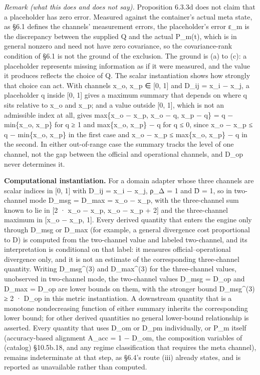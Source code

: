 \documentclass[
]{article}
\begin{document}
\emph{Remark (what this does and does not say).} Proposition 6.3.3d does
not claim that a placeholder has zero error. Measured against the
container's actual meta state, as §6.1 defines the channels' measurement
errors, the placeholder's error ε\_m is the discrepancy between the
supplied Q and the actual P\_m(t), which is in general nonzero and need
not have zero covariance, so the covariance-rank condition of §6.1 is
not the ground of the exclusion. The ground is (a) to (c): a placeholder
represents missing information as if it were measured, and the value it
produces reflects the choice of Q. The scalar instantiation shows how
strongly that choice can act. With channels x\_o, x\_p ∈ {[}0, 1{]} and
D\_ij = \textbar x\_i − x\_j\textbar, a placeholder q inside {[}0, 1{]}
gives a maximum summary that depends on where q sits relative to x\_o
and x\_p; and a value outside {[}0, 1{]}, which is not an admissible
index at all, gives max\{\textbar x\_o − x\_p\textbar, \textbar x\_o −
q\textbar, \textbar x\_p − q\textbar\} = q − min\{x\_o, x\_p\} for q ≥ 1
and max\{x\_o, x\_p\} − q for q ≤ 0, since \textbar x\_o −
x\_p\textbar{} ≤ q − min\{x\_o, x\_p\} in the first case and
\textbar x\_o − x\_p\textbar{} ≤ max\{x\_o, x\_p\} − q in the second. In
either out-of-range case the summary tracks the level of one channel,
not the gap between the official and operational channels, and D\_op
never determines it.

\textbf{Computational instantiation.} For a domain adapter whose three
channels are scalar indices in {[}0, 1{]} with D\_ij = \textbar x\_i −
x\_j\textbar, ρ\_Δ = 1 and D̄ = 1, so in two-channel mode D\_msg = D\_max
= \textbar x\_o − x\_p\textbar, with the three-channel sum known to lie
in {[}2 · \textbar x\_o − x\_p\textbar, \textbar x\_o − x\_p\textbar{} +
2{]} and the three-channel maximum in {[}\textbar x\_o − x\_p\textbar,
1{]}. Every derived quantity that enters the engine only through D\_msg
or D\_max (for example, a general divergence cost proportional to D) is
computed from the two-channel value and labeled two-channel, and its
interpretation is conditional on that label: it measures
official--operational divergence only, and it is not an estimate of the
corresponding three-channel quantity. Writing D\_msg\^{}(3) and
D\_max\^{}(3) for the three-channel values, unobserved in two-channel
mode, the two-channel values D\_msg = D\_op and D\_max = D\_op are lower
bounds on them, with the stronger bound D\_msg\^{}(3) ≥ 2 · D\_op in
this metric instantiation. A downstream quantity that is a monotone
nondecreasing function of either summary inherits the corresponding
lower bound; for other derived quantities no general lower-bound
relationship is asserted. Every quantity that uses D\_om or D\_pm
individually, or P\_m itself (accuracy-based alignment A\_acc = 1 −
D\_om, the composition variables of (catalog) §10.5b.18, and any regime
classification that requires the meta channel), remains indeterminate at
that step, as §6.4's route (iii) already states, and is reported as
unavailable rather than computed.
\end{document}
